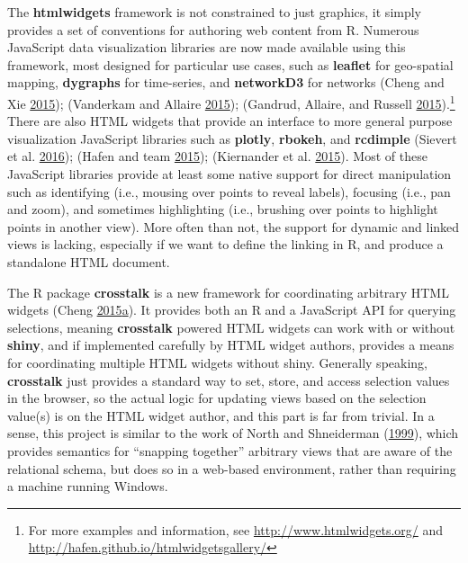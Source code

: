 \documentclass[12pt,]{isuthesis}
\let\rmarkdownfootnote\footnote%
\def\footnote{\protect\rmarkdownfootnote}
\begin{document}
The \textbf{htmlwidgets} framework is not constrained to just graphics,
it simply provides a set of conventions for authoring web content from
R. Numerous JavaScript data visualization libraries are now made
available using this framework, most designed for particular use cases,
such as \textbf{leaflet} for geo-spatial mapping, \textbf{dygraphs} for
time-series, and \textbf{networkD3} for networks (Cheng and Xie
\protect\hyperlink{ref-leaflet}{2015}); (Vanderkam and Allaire
\protect\hyperlink{ref-dygraphs}{2015}); (Gandrud, Allaire, and Russell
\protect\hyperlink{ref-networkD3}{2015}).\footnote{For more examples and
  information, see \url{http://www.htmlwidgets.org/} and
  \url{http://hafen.github.io/htmlwidgetsgallery/}} There are also HTML
widgets that provide an interface to more general purpose visualization
JavaScript libraries such as \textbf{plotly}, \textbf{rbokeh}, and
\textbf{rcdimple} (Sievert et al. \protect\hyperlink{ref-plotly}{2016});
(Hafen and team \protect\hyperlink{ref-rbokeh}{2015}); (Kiernander et
al. \protect\hyperlink{ref-rcdimple}{2015}). Most of these JavaScript
libraries provide at least some native support for direct manipulation
such as identifying (i.e., mousing over points to reveal labels),
focusing (i.e., pan and zoom), and sometimes highlighting (i.e.,
brushing over points to highlight points in another view). More often
than not, the support for dynamic and linked views is lacking,
especially if we want to define the linking in R, and produce a
standalone HTML document.

The R package \textbf{crosstalk} is a new framework for coordinating
arbitrary HTML widgets (Cheng
\protect\hyperlink{ref-crosstalk}{2015}\protect\hyperlink{ref-crosstalk}{a}).
It provides both an R and a JavaScript API for querying selections,
meaning \textbf{crosstalk} powered HTML widgets can work with or without
\textbf{shiny}, and if implemented carefully by HTML widget authors,
provides a means for coordinating multiple HTML widgets without shiny.
Generally speaking, \textbf{crosstalk} just provides a standard way to
set, store, and access selection values in the browser, so the actual
logic for updating views based on the selection value(s) is on the HTML
widget author, and this part is far from trivial. In a sense, this
project is similar to the work of North and Shneiderman
(\protect\hyperlink{ref-North:1999vi}{1999}), which provides semantics
for ``snapping together'' arbitrary views that are aware of the
relational schema, but does so in a web-based environment, rather than
requiring a machine running Windows.
\end{document}
